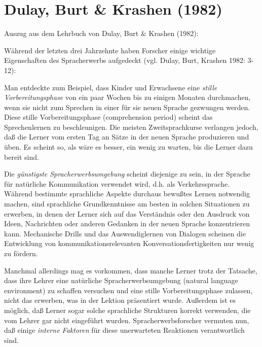 \documentclass[
  letterpaper,
]{scrbook}
\begin{document}
\hypertarget{dulay-burt-krashen-1982}{%
\section{Dulay, Burt \& Krashen (1982)}\label{dulay-burt-krashen-1982}}

Auszug aus dem Lehrbuch von Dulay, Burt \& Krashen (1982):

Während der letzten drei Jahrzehnte haben Forscher einige wichtige
Eigenschaften des Spracherwerbs aufgedeckt (vgl. Dulay, Burt, Krashen
1982: 3-12):

Man entdeckte zum Beispiel, dass Kinder und Erwachsene eine \emph{stille
Vorbereitungsphase} von ein paar Wochen bis zu einigen Monaten
durchmachen, wenn sie nicht zum Sprechen in einer für sie neuen Sprache
gezwungen werden. Diese stille Vorbereitungsphase (comprehension period)
scheint das Sprechenlernen zu beschleunigen. Die meisten
Zweitsprachkurse verlangen jedoch, daß die Lerner vom ersten Tag an
Sätze in der neuen Sprache produzieren und üben. Es scheint so, als wäre
es besser, ein wenig zu warten, bis die Lerner dazu bereit sind.

Die \emph{günstigste Spracherwerbsumgebung} scheint diejenige zu sein,
in der Sprache für natürliche Kommunikation verwendet wird, d.h. als
Verkehrssprache. Während bestimmte sprachliche Aspekte durchaus bewußtes
Lernen notwendig machen, sind sprachliche Grundkenntnisse am besten in
solchen Situationen zu erwerben, in denen der Lerner sich auf das
Verständnis oder den Ausdruck von Ideen, Nachrichten oder anderen
Gedanken in der neuen Sprache konzentrieren kann. Mechanische Drills und
das Auswendiglernen von Dialogen scheinen die Entwicklung von
kommunikationsrelevanten Konversationsfertigkeiten nur wenig zu fördern.

Manchmal allerdings mag es vorkommen, dass manche Lerner trotz der
Tatsache, dass ihre Lehrer eine natürliche Spracherwerbsumgebung
(natural language environment) zu schaffen versuchen und eine stille
Vorbereitungsphase zulassen, nicht das erwerben, was in der Lektion
präsentiert wurde. Außerdem ist es möglich, daß Lerner sogar solche
sprachliche Strukturen korrekt verwenden, die vom Lehrer gar nicht
eingeführt wurden. Spracherwerbsforscher vermuten nun, daß einige
\emph{interne Faktoren} für diese unerwarteten Reaktionen verantwortlich
sind.
\end{document}
